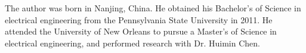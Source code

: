 
\begin{singlespace}

The author was born in Nanjing, China. He obtained his Bachelor's of Science in electrical engineering from the Pennsylvania State University in 2011. He attended the University of New Orleans to pursue a Master's of Science in electrical engineering, and performed research with Dr. Huimin Chen.
\end{singlespace}
